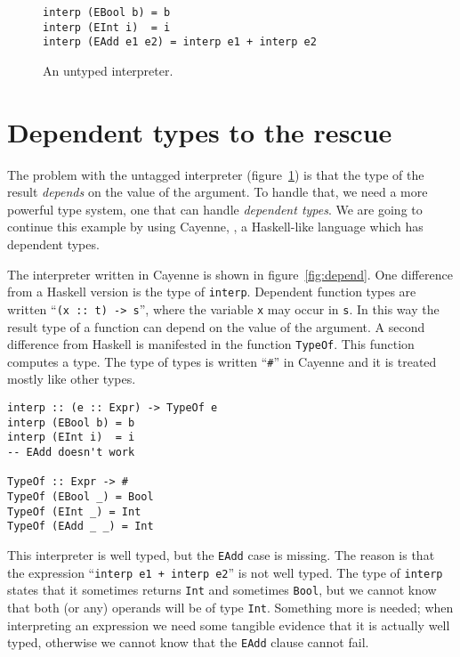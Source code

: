 \documentclass{llncs}[12pt]             %
\newcommand{\te}[1]{{\tt #1}}
\begin{document}
\begin{figure}
\begin{verbatim}
interp (EBool b) = b
interp (EInt i)  = i
interp (EAdd e1 e2) = interp e1 + interp e2
\end{verbatim}
\caption{An untyped interpreter.}
\label{fig:untyped}
\end{figure}

\section{Dependent types to the rescue}
The problem with the untagged interpreter (figure~\ref{fig:untyped})
is that the type of the result {\em depends} on the value of the
argument.  To handle that, we need a more powerful type system,
one that can handle {\em dependent types}.  We are going to continue
this example by using Cayenne, \cite{augustsson:cayenne}, a Haskell-like
language which has dependent types.

The interpreter written in Cayenne is shown in figure~\ref{fig:depend}.
One difference from a Haskell version is the type of \te{interp}.
Dependent function types are written ``\te{(x~::~t)~->~s}'', where the
variable \te{x} may occur in \te{s}.  In this way the result type
of a function can depend on the value of the argument.  A second
difference from Haskell is manifested in the function \te{TypeOf}.  This function
computes a type.  The type of types is written ``\te{\#}'' in Cayenne and
it is treated mostly like other types.

\begin{figure*}
\begin{verbatim}
interp :: (e :: Expr) -> TypeOf e
interp (EBool b) = b
interp (EInt i)  = i
-- EAdd doesn't work

TypeOf :: Expr -> #
TypeOf (EBool _) = Bool
TypeOf (EInt _) = Int
TypeOf (EAdd _ _) = Int
\end{verbatim}
\caption{A dependently typed interpreter.}
\label{fig:depend}
\end{figure*}

This interpreter is well typed, but the \te{EAdd} case is missing.
The reason is that the expression ``\te{interp e1 + interp e2}''
is not well typed.  The type of \te{interp} states that it sometimes
returns \te{Int} and sometimes \te{Bool}, but we cannot know that
both (or any) operands will be of type \te{Int}.  Something more
is needed; when interpreting an expression we need some tangible
evidence that it is actually well typed, otherwise we cannot know
that the \te{EAdd} clause cannot fail.
\end{document}
